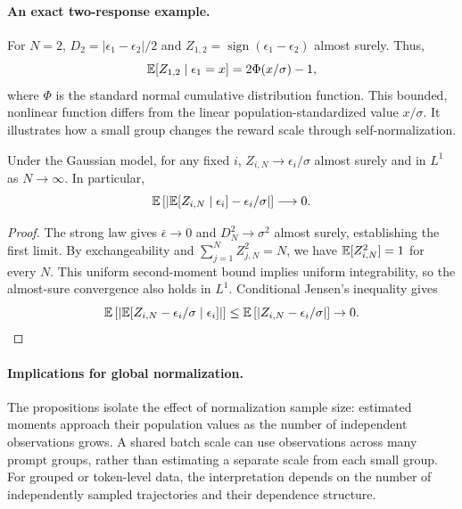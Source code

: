 \paragraph{An exact two-response example.}
For $N=2$, $D_2=|\epsilon_1-\epsilon_2|/2$ and
$Z_{1,2}=\operatorname{sign}(\epsilon_1-\epsilon_2)$ almost surely. Thus,
\begin{equation}
 \mathbb{E}[Z_{1,2}\mid\epsilon_1=x]=2\Phi(x/\sigma)-1,
 \label{eq:two_sample}
\end{equation}
where $\Phi$ is the standard normal cumulative distribution function. This bounded, nonlinear function differs from the linear population-standardized value $x/\sigma$. It illustrates how a small group changes the reward scale through self-normalization.

\begin{proposition}\label{prop:limit}
Under the Gaussian model, for any fixed $i$, $Z_{i,N}\to\epsilon_i/\sigma$ almost surely and in $L^1$ as $N\to\infty$. In particular,
\begin{equation}
 \mathbb{E}\left[\left|\mathbb{E}[Z_{i,N}\mid\epsilon_i]-\epsilon_i/\sigma\right|\right]\longrightarrow0.
\end{equation}
\end{proposition}
\begin{proof}
The strong law gives $\bar\epsilon\to0$ and $D_N^2\to\sigma^2$ almost surely, establishing the first limit. By exchangeability and $\sum_{j=1}^{N}Z_{j,N}^2=N$, we have $\mathbb{E}[Z_{i,N}^2]=1$ for every $N$. This uniform second-moment bound implies uniform integrability, so the almost-sure convergence also holds in $L^1$. Conditional Jensen's inequality gives
\begin{equation}
 \mathbb{E}\left[\left|\mathbb{E}[Z_{i,N}-\epsilon_i/\sigma\mid\epsilon_i]\right|\right]
 \leq\mathbb{E}\left[|Z_{i,N}-\epsilon_i/\sigma|\right]\to0.
\end{equation}
\end{proof}

\paragraph{Implications for global normalization.}
The propositions isolate the effect of normalization sample size: estimated moments approach their population values as the number of independent observations grows. A shared batch scale can use observations across many prompt groups, rather than estimating a separate scale from each small group. For grouped or token-level data, the interpretation depends on the number of independently sampled trajectories and their dependence structure.

